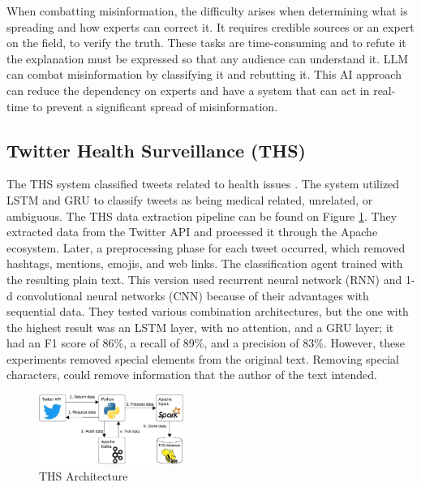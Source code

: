 When combatting misinformation, the difficulty arises when determining what is spreading and how experts can correct it. It requires  credible sources or an expert on the field, to verify the truth.
These tasks are time-consuming and to refute it the
explanation must be expressed so that any audience can understand it. 
LLM can combat misinformation by classifying it and rebutting it. 
This AI approach can reduce the dependency on experts and have a system that can act in real-time to prevent a significant spread of misinformation.


\subsection{Twitter Health Surveillance (THS)}
The THS system classified tweets related to health issues \cite{8622504, 9581175}. The system utilized LSTM and GRU to classify tweets as being medical related, unrelated, or ambiguous.  The THS
data extraction pipeline can be found on Figure \ref{ths_architecture}. They extracted data from the Twitter API and processed it through the Apache ecosystem. Later, a preprocessing phase
for each tweet occurred, which removed hashtags, mentions, emojis, and web links. The classification agent trained with the resulting plain text. This version used recurrent neural network (RNN) and
1-d convolutional neural networks (CNN) because of their advantages with sequential data. They tested various combination architectures, but the one with the highest result was an LSTM layer, with no attention,
and a GRU layer; it had an F1 score of 86\%, a recall of 89\%, and a precision of 83\%.   However, these experiments removed special elements from the original text. %
Removing special characters, could remove information that the author of the text intended. 

 
  \begin{figure}[!h]
    \centering
        \includegraphics[width=0.42\textwidth]{figures/ths_architecture.jpeg}
        \caption{THS Architecture}
        \label{ths_architecture}
\end{figure}

